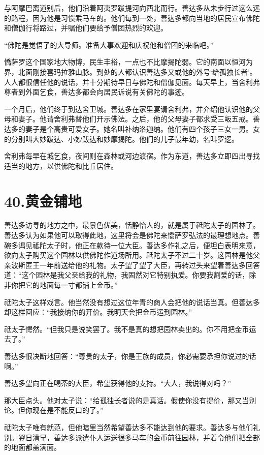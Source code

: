 \documentclass[12pt,twoside,openany]{book}
\begin{document}
与阿摩巴离道别后，他们沿着阿夷罗跋提河向西北而行。善达多从未步行过这么远的路程，因为他是习惯乘马车的。他们每到一处，善达多都向当地的居民宣布佛陀和僧伽行将路过，并嘱他们要给予僧团热烈的欢迎。

“佛陀是觉悟了的大导师。准备大事欢迎和庆祝他和僧团的来临吧。”

憍萨罗这个国家地大物博，民生丰裕，一点也不比摩揭陀弱。它的南面以恒河为界，北面刚接喜玛拉雅山脉。到处的人都认识善达多又或他的外号‘给孤独长者’。人人都很信任他的说话，并十分期待早日与佛陀和僧伽见面。每天早上，当舍利弗尊者到外面乞食，善达多都会向居民诉说有关佛陀的事迹。

一个月后，他们终于到达舍卫城。善达多在家里宴请舍利弗，并介绍他认识他的父母和妻子。他请舍利弗替他们开示佛法。之后，他的父母妻子都求受三皈五戒。善达多的妻子是个高贵可爱女子。她名叫补纳洛迦纳。他们有四个孩子三女一男。女的分别叫大妙跋达、小妙跋达和妙摩揭陀。他们的儿子最年幼，名叫罗逻。

舍利弗每早在城乞食，夜间则在森林或河边渡宿。作为东道，善达多立即四出寻找适当的地方，以供佛陀和比丘居住。


\chapter{40.黄金铺地}\label{ch40}

善达多访寻的地方之中，最景色优美，恬静怡人的，就是属于祗陀太子的园林了。善达多认为如果他可以取得此地，这里将会是佛陀来憍萨罗弘法的最理想地点。善碗多谒见祗陀太子时，他正在款待一位大臣。善达多作礼之后，便坦白表明来意，欲向太子购买这个园林以供佛陀作道场所用。祗陀太子不过二十岁。这园林是他父亲波斯匿王一年前送给他的礼物。太子望了望了大臣，再转过头来望着善达多回答道：“这个园林是我父亲给我的礼物，我固然对它特别执爱。你要我割爱的话，除非你把它的地面每一寸都铺上金币。”

祗陀太子这样戏言。他当然没有想过这位年青的商人会把他的说话当真。但善达多却这样回应：“我接纳你的开价。我明天会把金币运到园林。”

祗太子愕然。“但我只是说笑罢了。我不是真的想把园林卖出的。你不用把金币运去了。”

善达多很决断地回答：“尊贵的太子，你是王族的成员，你必需要承担你说过的话啊。”

善达多望向正在喝茶的大臣，希望获得他的支持。“大人，我说得对吗？”

那大臣点头。他对太子说：“给孤独长者说的是真话。假使你没有提价，那又当别论。但你现在是不能反口的了。”

祗陀太子唯有就范，但他暗里当然希望善达多不能达到他的要求。善达多与他们礼别。翌日清早，善达多派遣仆人运送很多马车的金币前往园林，并着令他们把全部的地面都盖满面。
\end{document}
